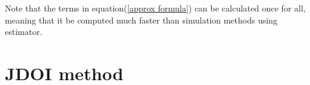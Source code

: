 Note that the terms in equation(\eqref{approx formula}) can be calculated once for all, meaning that it be computed much faster than simulation methods using estimator.

\section{JDOI method}
\label{sec: 2.3}
  
\normalsize 



